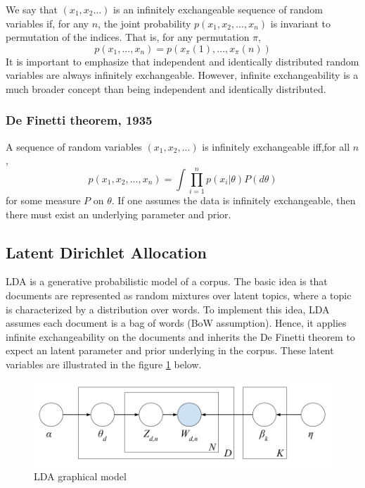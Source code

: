 \documentclass[conference,compsoc]{IEEEtran}
\begin{document}
We say that $(x_1,x_2...)$ is an infinitely exchangeable sequence of random variables if, for any $n$, the joint probability $p(x_1,x_2,...,x_n)$ is invariant to permutation of the indices. That is, for any permutation $\pi$,
\[p(x_1,...,x_n) = p(x_\pi(1),...,x_\pi(n))\]
It is important to emphasize that independent and identically distributed random variables are always infinitely exchangeable. However, infinite exchangeability is a much broader concept than being independent and identically distributed. 

\subsubsection{De Finetti theorem, 1935}
A sequence of random variables $(x_1,x_2,...)$ is infinitely exchangeable iff,for all $n$,
\[p(x_1,x_2,...,x_n)=\int\prod_{i=1}^{n}p(x_i|\theta)P(d\theta)\]
for some measure $P$ on $\theta$.
If one assumes the data is infinitely exchangeable, then there must exist an underlying parameter and prior.

\subsection{Latent Dirichlet Allocation} \label{lda}

LDA is a generative probabilistic model of a corpus. The basic idea is that documents are represented as random mixtures over latent topics, where a topic is characterized by a distribution over words. To implement this idea, LDA assumes each document is a bag of words (BoW assumption). Hence, it applies infinite exchangeability on the documents and inherits the De Finetti theorem to expect an latent parameter and prior underlying in the corpus. These latent variables are illustrated in the figure \ref{fig:lda_model} below.


\begin{figure}[h]
	\centering
	\includegraphics[scale=0.2]{lda_model}
	\caption{LDA graphical model}
	\label{fig:lda_model}
\end{figure}
\end{document}

